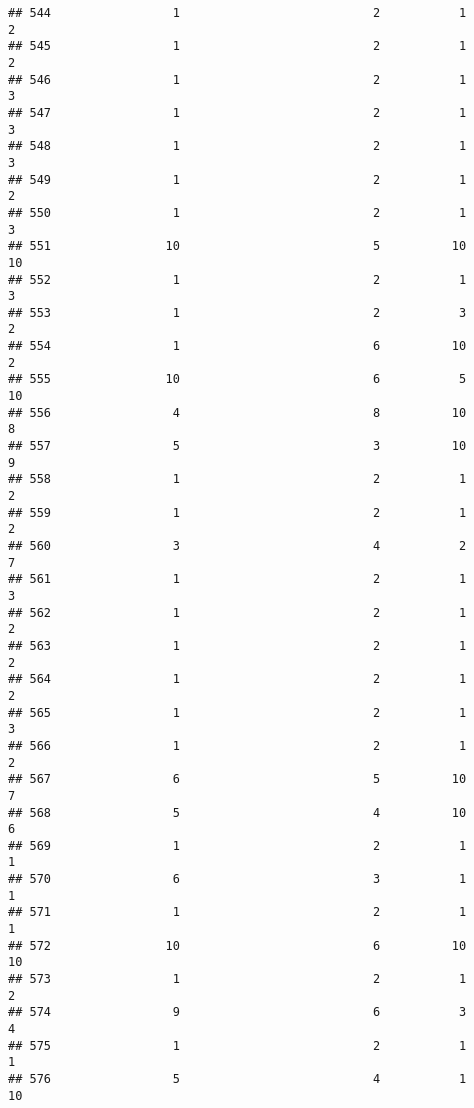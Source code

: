 \documentclass[
]{article}
\begin{document}
\begin{verbatim}
## 544                 1                           2           1               2
## 545                 1                           2           1               2
## 546                 1                           2           1               3
## 547                 1                           2           1               3
## 548                 1                           2           1               3
## 549                 1                           2           1               2
## 550                 1                           2           1               3
## 551                10                           5          10              10
## 552                 1                           2           1               3
## 553                 1                           2           3               2
## 554                 1                           6          10               2
## 555                10                           6           5              10
## 556                 4                           8          10               8
## 557                 5                           3          10               9
## 558                 1                           2           1               2
## 559                 1                           2           1               2
## 560                 3                           4           2               7
## 561                 1                           2           1               3
## 562                 1                           2           1               2
## 563                 1                           2           1               2
## 564                 1                           2           1               2
## 565                 1                           2           1               3
## 566                 1                           2           1               2
## 567                 6                           5          10               7
## 568                 5                           4          10               6
## 569                 1                           2           1               1
## 570                 6                           3           1               1
## 571                 1                           2           1               1
## 572                10                           6          10              10
## 573                 1                           2           1               2
## 574                 9                           6           3               4
## 575                 1                           2           1               1
## 576                 5                           4           1              10

\end{verbatim}
\end{document}
